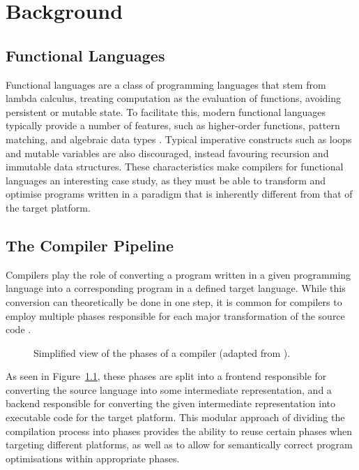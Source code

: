 \chapter{Background}

\section{Functional Languages}

Functional languages are a class of programming languages that stem from lambda calculus, treating
computation as the evaluation of functions, avoiding persistent or mutable state. To facilitate
this, modern functional languages typically provide a number of features, such as higher-order
functions, pattern matching, and algebraic data types \autocite{hudak1989conception}. Typical
imperative constructs such as loops and mutable variables are also discouraged, instead favouring
recursion and immutable data structures. These characteristics make compilers for functional
languages an interesting case study, as they must be able to transform and optimise programs written
in a paradigm that is inherently different from that of the target platform.

\section{The Compiler Pipeline}

Compilers play the role of converting a program written in a given programming language into a
corresponding program in a defined target language. While this conversion can theoretically be done
in one step, it is common for compilers to employ multiple phases responsible for each major
transformation of the source code \autocite{grune2012modern}.

\begin{figure}
    \centering
    
    \caption{Simplified view of the phases of a compiler (adapted from \autocite{grune2012modern}).}
    \label{fig:compiler-pipeline}
\end{figure}

As seen in Figure~\ref{fig:compiler-pipeline}, these phases are split into a frontend responsible
for converting the source language into some intermediate representation, and a backend responsible
for converting the given intermediate representation into executable code for the target platform.
This modular approach of dividing the compilation process into phases provides the ability to reuse
certain phases when targeting different platforms, as well as to allow for semantically correct
program optimisations within appropriate phases.

